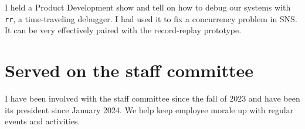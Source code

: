 \documentclass[11pt]{article}
\begin{document}
I held a Product Development show and tell on how to debug our systems with \texttt{rr}, a time-traveling debugger. I had used it to fix a concurrency problem in SNS. It can be very effectively paired with the record-replay prototype.

\section{Served on the staff committee}
\label{sec:orgc3a81e4}

I have been involved with the staff committee since the fall of 2023 and have been its president since January 2024. We help keep employee morale up with regular events and activities.
\end{document}
